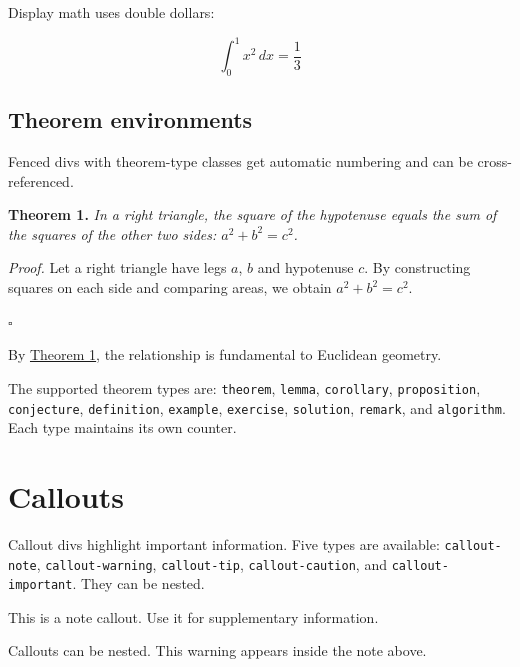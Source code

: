 \documentclass[11pt]{article}
\begin{document}
Display math uses double dollars:

$$
\int_0^1 x^2 \, dx = \frac{1}{3}
$$

\subsection*{Theorem environments}
\label{theorem-environments}

Fenced divs with theorem-type classes get automatic numbering and can be cross-referenced.



\par\medskip\noindent\textbf{Theorem 1.} \label{thm-pythagoras} \itshape{} In a right triangle, the square of the hypotenuse equals the sum of the squares of the other two sides: $a^2 + b^2 = c^2$.

\upshape\medskip

\par\medskip\noindent\textit{Proof.} Let a right triangle have legs $a$, $b$ and hypotenuse $c$. By constructing squares on each side and comparing areas, we obtain $a^2 + b^2 = c^2$.

 \hfill$\square$\medskip

By \hyperref[thm-pythagoras]{Theorem 1}, the relationship is fundamental to Euclidean geometry.

The supported theorem types are: \texttt{theorem}, \texttt{lemma}, \texttt{corollary}, \texttt{proposition}, \texttt{conjecture}, \texttt{definition}, \texttt{example}, \texttt{exercise}, \texttt{solution}, \texttt{remark}, and \texttt{algorithm}. Each type maintains its own counter.

\section*{Callouts}
\label{callouts}

Callout divs highlight important information. Five types are available: \texttt{callout-note}, \texttt{callout-warning}, \texttt{callout-tip}, \texttt{callout-caution}, and \texttt{callout-important}. They can be nested.



\begin{tcolorbox}[enhanced, breakable, colback=blue!5, colframe=blue!40,
  left=4pt, right=4pt, top=4pt, bottom=4pt,
  boxrule=0pt, leftrule=3pt, arc=0pt, outer arc=0pt,
  title=Note, fonttitle=\bfseries]
This is a note callout. Use it for supplementary information.



\begin{tcolorbox}[enhanced, breakable, colback=yellow!10, colframe=yellow!60!black,
  left=4pt, right=4pt, top=4pt, bottom=4pt,
  boxrule=0pt, leftrule=3pt, arc=0pt, outer arc=0pt,
  title=Warning, fonttitle=\bfseries]
Callouts can be nested. This warning appears inside the note above.


\end{tcolorbox}
\end{tcolorbox}
\end{document}
